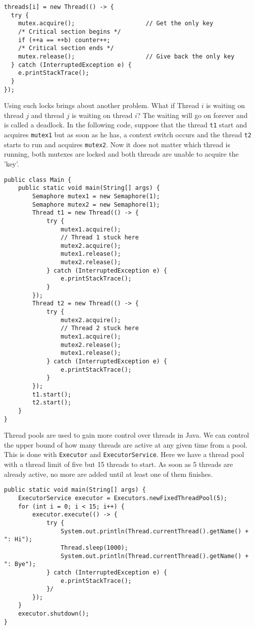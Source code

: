 \begin{lstlisting}[style=A_Java]
threads[i] = new Thread(() -> {
  try {
    mutex.acquire();                    // Get the only key
    /* Critical section begins */
    if (++a == ++b) counter++;
    /* Critical section ends */
    mutex.release();                    // Give back the only key
  } catch (InterruptedException e) {
    e.printStackTrace();
  }
});
\end{lstlisting}
Using such locks brings about another problem. What if Thread $i$ is waiting on thread $j$ and thread $j$ is waiting on thread $i$? The waiting will go on forever and is called a deadlock. In the following code, suppose that the thread \texttt{t1} start and acquires \texttt{mutex1} but as soon as he has, a context switch occurs and the thread \texttt{t2} starts to run and acquires \texttt{mutex2}. Now it does not matter which thread is running, both mutexes are locked and both threads are unable to acquire the 'key'.
\begin{lstlisting}[style=A_Java]
public class Main {
    public static void main(String[] args) {
        Semaphore mutex1 = new Semaphore(1);
        Semaphore mutex2 = new Semaphore(1);
        Thread t1 = new Thread(() -> {
            try {
                mutex1.acquire();
                // Thread 1 stuck here
                mutex2.acquire();
                mutex1.release();
                mutex2.release();
            } catch (InterruptedException e) {
                e.printStackTrace();
            }
        });
        Thread t2 = new Thread(() -> {
            try {
                mutex2.acquire();
                // Thread 2 stuck here
                mutex1.acquire();
                mutex2.release();
                mutex1.release();
            } catch (InterruptedException e) {
                e.printStackTrace();
            }
        });
        t1.start();
        t2.start();
    }
}
\end{lstlisting}
Thread pools are used to gain more control over threads in Java. We can control the upper bound of how many threads are active at any given time from a pool. This is done with \texttt{Executor} and \texttt{ExecutorService}. Here we have a thread pool with a thread limit of five but 15 threads to start. As soon as 5 threads are already active, no more are added until at least one of them finishes.
\begin{lstlisting}[style=A_Java]
public static void main(String[] args) {
    ExecutorService executor = Executors.newFixedThreadPool(5);
    for (int i = 0; i < 15; i++) {
        executor.execute(() -> {
            try {
                System.out.println(Thread.currentThread().getName() + ": Hi");
                Thread.sleep(1000);
                System.out.println(Thread.currentThread().getName() + ": Bye");
            } catch (InterruptedException e) {
                e.printStackTrace();
            }/
        });
    }
    executor.shutdown();
}
\end{lstlisting}


